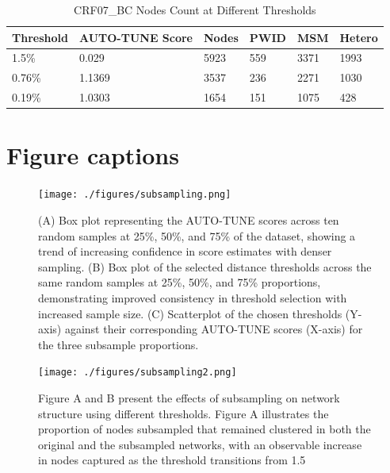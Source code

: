 \documentclass[utf8]{FrontiersinHarvard} %
\begin{document}
\begin{table}[h!]
	\caption{CRF07\_BC Nodes Count at Different Thresholds}
	\label{table:combined}
	\centering
	\begin{tabularx}{\textwidth}{|X|X|X|X|X|X|}
		\hline
		Threshold & AUTO-TUNE Score & Nodes & PWID & MSM  & Hetero \\
		\hline
		1.5\%     & 0.029           & 5923  & 559  & 3371 & 1993   \\
		0.76\%    & 1.1369          & 3537  & 236  & 2271 & 1030   \\
		0.19\%    & 1.0303          & 1654  & 151  & 1075 & 428    \\
		\hline
	\end{tabularx}
\end{table}

\clearpage

\section{Figure captions}

\begin{figure}[h!]
  \centering
  \texttt{[image: ./figures/subsampling.png]}
	\caption{ (A) Box plot representing the AUTO-TUNE scores across ten random
		samples at 25\%, 50\%, and 75\% of the \citep{rhee_national_2019} dataset,
		showing a trend of increasing confidence in score estimates with denser
		sampling. (B) Box plot of the selected distance thresholds across the same
		random samples at 25\%, 50\%, and 75\% proportions, demonstrating improved
		consistency in threshold selection with increased sample size. (C)
		Scatterplot of the chosen thresholds (Y-axis) against their corresponding
		AUTO-TUNE scores (X-axis) for the three subsample proportions.
	}\label{fig:subsampling}
\end{figure}

\begin{figure}[h!]
  \centering
  \texttt{[image: ./figures/subsampling2.png]}
	\caption{
		Figure A and B present the effects of subsampling on network structure using different thresholds. Figure A illustrates the proportion of nodes subsampled that remained clustered in both the original and the subsampled networks, with an observable increase in nodes captured as the threshold transitions from 1.5%
	}\label{fig:subsampling2}
\end{figure}
\end{document}
